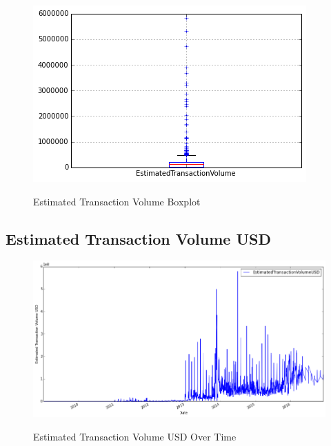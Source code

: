 \begin{figure}[bth]
  \myfloatalign
  {\includegraphics[width=1\linewidth]
    {gfx/estimated-transaction-volume-boxplot}}
  \caption{Estimated Transaction Volume Boxplot}
  \label{fig:estimated-transaction-volume-boxplot}
\end{figure}

\clearpage

\subsection{Estimated Transaction Volume USD}
\label{sec:estimated-transaction-volume-usd}

\begin{figure}[bth]
  \myfloatalign
  {\includegraphics[width=1\linewidth]
    {gfx/estimated-transaction-volume-usd-over-time}}
  \caption{Estimated Transaction Volume USD Over Time}
  \label{fig:estimated-transaction-volume-usd-over-time}
\end{figure}


